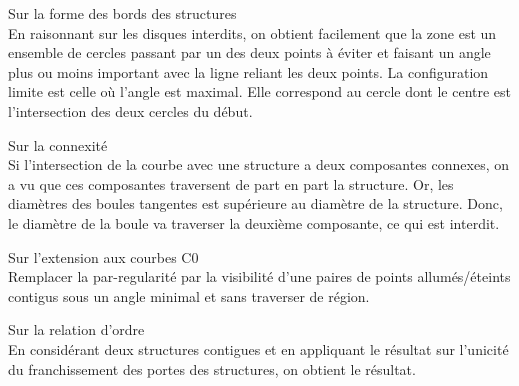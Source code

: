 \documentclass{report}
\begin{document}
\newpage

Sur la forme des bords des structures\\
En raisonnant sur les disques interdits, on obtient facilement que la zone est un ensemble de cercles passant par un des deux points à éviter et faisant un angle plus ou moins important avec la ligne reliant les deux points.
La configuration limite est celle où l'angle est maximal. Elle correspond au cercle dont le centre est l'intersection des deux cercles du début.

Sur la connexité\\
Si l'intersection de la courbe avec une structure a deux composantes connexes, on a vu que ces composantes traversent de part en part la structure.
Or, les diamètres des boules tangentes est supérieure au diamètre de la structure. Donc, le diamètre de la boule va traverser la deuxième composante, ce qui est interdit.

Sur l'extension aux courbes C0\\
Remplacer la par-regularité par la visibilité d'une paires de points allumés/éteints contigus sous un angle minimal et sans traverser de région.

Sur la relation d'ordre\\
En considérant deux structures contigues et en appliquant le résultat sur l'unicité du franchissement des portes des structures, on obtient le résultat.
\end{document}
